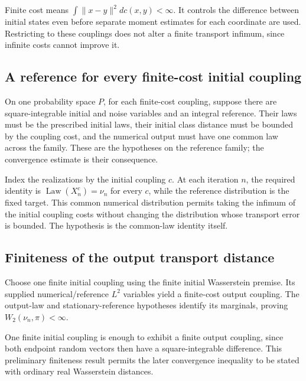 \documentclass[11pt,a4paper]{article}
\begin{document}
Finite cost means \(\int\|x-y\|^2dc(x,y)<\infty\). It controls the difference between initial states even before separate moment estimates for each coordinate are used. Restricting to these couplings does not alter a finite transport infimum, since infinite costs cannot improve it.


\subsection{\texorpdfstring{A reference for every finite-cost initial coupling}{A reference for every finite-cost initial coupling}}


On one probability space \(P\), for each finite-cost coupling, suppose there are square-integrable initial and noise variables and an integral reference. Their laws must be the prescribed initial laws, their initial class distance must be bounded by the coupling cost, and the numerical output must have one common law across the family. These are the hypotheses on the reference family; the convergence estimate is their consequence.



Index the realizations by the initial coupling \(c\). At each iteration \(n\), the required identity is \(\operatorname{Law}(X_n^c)=\nu_n\) for every \(c\), while the reference distribution is the fixed target. This common numerical distribution permits taking the infimum of the initial coupling costs without changing the distribution whose transport error is bounded. The hypothesis is the common-law identity itself.


\subsection{\texorpdfstring{Finiteness of the output transport distance}{Finiteness of the output transport distance}}


Choose one finite initial coupling using the finite initial Wasserstein premise. Its supplied numerical/\allowbreak{}reference \(L^2\) variables yield a finite-cost output coupling. The output-law and stationary-reference hypotheses identify its marginals, proving \(W_2(\nu_n,\pi)<\infty\).



One finite initial coupling is enough to exhibit a finite output coupling, since both endpoint random vectors then have a square-integrable difference. This preliminary finiteness result permits the later convergence inequality to be stated with ordinary real Wasserstein distances.
\end{document}
